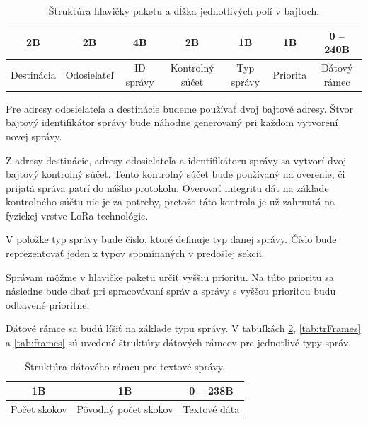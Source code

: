 \documentclass[slovak,master]{diploma}
\begin{document}
\begin{table}[!h]
	\centering
  \caption{Štruktúra hlavičky paketu a dĺžka jednotlivých polí v bajtoch.}
  \begin{tabular}{|c|c|c|c|c|c|c|}
    \toprule
    2B & 2B & 4B & 2B & 1B & 1B & 0 -- 240B \\
    \midrule
    Destinácia & Odosielateľ & ID správy & Kontrolný súčet & Typ správy & Priorita & Dátový rámec \\
    \midrule
  \end{tabular}
  \label{tab:packetHeader}
\end{table}

Pre adresy odosielateľa a destinácie budeme používať dvoj bajtové adresy. Štvor bajtový identifikátor správy bude náhodne generovaný pri každom vytvorení novej správy.

Z adresy destinácie, adresy odosielateľa a identifikátoru správy sa vytvorí dvoj bajtový kontrolný súčet. Tento kontrolný súčet bude používaný na overenie, či prijatá správa 
patrí do nášho protokolu. Overovať integritu dát na základe kontrolného súčtu nie je za potreby, pretože táto kontrola je už zahrnutá na fyzickej vrstve LoRa technológie.

V položke typ správy bude číslo, ktoré definuje typ danej správy. Číslo bude reprezentovať jeden z typov spomínaných v predošlej sekcii.

Správam môžme v hlavičke paketu určiť vyššiu prioritu. Na túto prioritu sa následne bude dbať pri spracovávaní správ a správy s vyššou prioritou budu odbavené prioritne.

Dátové rámce sa budú líšiť na základe typu správy. V tabuľkách \ref{tab:textFrame}, \ref{tab:trFrames} a \ref{tab:frames} 
sú uvedené štruktúry dátových rámcov pre jednotlivé typy správ.


\begin{table}[!h]
	\centering
  \caption{Štruktúra dátového rámcu pre textové správy.}
  \begin{tabular}{|c|c|c|}
    \toprule
    1B & 1B & 0 -- 238B \\
    \midrule
    Počet skokov & Pôvodný počet skokov & Textové dáta \\
    \midrule
  \end{tabular}
  \label{tab:textFrame}
\end{table}
\end{document}
